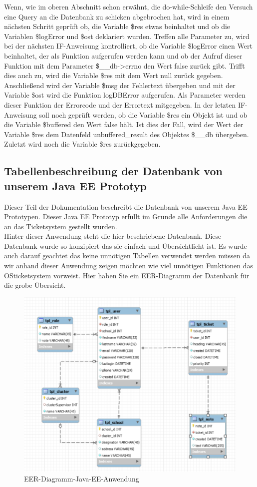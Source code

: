 Wenn, wie im oberen Abschnitt schon erwähnt, die do-while-Schleife den Versuch eine Query an die Datenbank zu schicken abgebrochen hat, wird in einem nächsten Schritt geprüft ob, die Variable \$res etwas beinhaltet und ob die Variablen \$logError und \$ost deklariert wurden. Treffen alle Parameter zu, wird bei der nächsten IF-Anweisung kontrolliert, ob die Variable \$logError einen Wert beinhaltet, der als Funktion aufgerufen werden kann und ob der Aufruf dieser Funktion mit dem Parameter \$\_\_db->errno den Wert false zurück gibt.
Trifft dies auch zu, wird die Variable \$res mit dem Wert null zurück gegeben. Anschließend wird der Variable \$msg der Fehlertext übergeben und mit der Variable \$ost  wird die Funktion logDBError aufgerufen. Als Parameter werden dieser Funktion der Errorcode und der Errortext mitgegeben.
In der letzten IF-Anweisung soll noch geprüft werden, ob die Variable \$res ein Objekt ist und ob die Variable \$buffered den Wert false hält. Ist dies der Fall, wird der Wert der Variable \$res dem Datenfeld unbuffered\_result des Objektes \$\_\_db übergeben. 
Zuletzt wird noch die Variable \$res zurückgegeben.
\newpage

\subsection{Tabellenbeschreibung der Datenbank von unserem Java EE Prototyp}
Dieser Teil der Dokumentation beschreibt die Datenbank von unserem Java EE Prototypen. Dieser Java EE Prototyp erfüllt im Grunde alle Anforderungen die an das Ticketsystem gestellt wurden.\\
Hinter dieser Anwendung steht die hier beschriebene Datenbank. Diese Datenbank wurde so konzipiert das sie einfach und Übersichtlicht ist. Es wurde auch darauf geachtet das keine unnötigen Tabellen verwendet werden müssen da wir anhand dieser Anwendung zeigen möchten wie viel unnötigen Funktionen das OSticketsystem vorweist.
Hier haben Sie ein EER-Diagramm der Datenbank für die grobe Übersicht.
\begin{figure}[h]
	\centering
	\includegraphics[scale=.8]{figures/EER-Diagramm-Java-EE-Anwendung.PNG}
	\caption{EER-Diagramm-Java-EE-Anwendung}
	\label{EER-Diagramm-Java-EE-Anwendung}
\end{figure}

